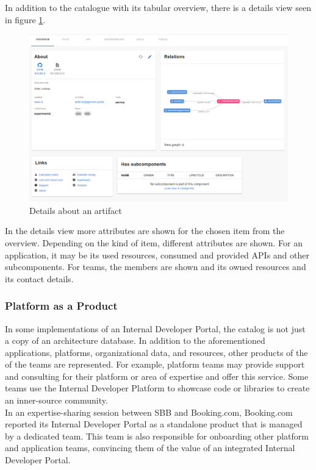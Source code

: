 \documentclass[a4paper,12pt]{article}
\begin{document}
    In addition to the catalogue with its tabular overview, there is a details view seen in figure \ref{fig:portaldetails}.
    \begin{figure}
        \includegraphics[width=\linewidth]{backstage_item_details}
        \caption{Details about an artifact}
        \label{fig:portaldetails}
    \end{figure}
    In the details view more attributes are shown for the chosen item from the overview.
    Depending on the kind of item, different attributes are shown.
    For an application, it may be its used resources, consumed and provided APIs and other subcomponents.
    For teams, the members are shown and its owned resources and its contact details.


    \subsubsection{Platform as a Product}
    \label{sssec:paap}
    In some implementations of an Internal Developer Portal, the catalog is not just a copy of an architecture database.
    In addition to the aforementioned applications, platforms, organizational data, and resources, other products of the
    of the teams are represented.
    For example, platform teams may provide support and consulting for their platform or area of expertise and offer this service.
    Some teams use the Internal Developer Platform to showcase code or libraries to create an inner-source community.\\
    In an expertise-sharing session between SBB and Booking.com, Booking.com reported its Internal Developer Portal as a
    standalone product that is managed by a dedicated team.
    This team is also responsible for onboarding other platform and application teams, convincing them of the
    value of an integrated Internal Developer Portal.
\end{document}
